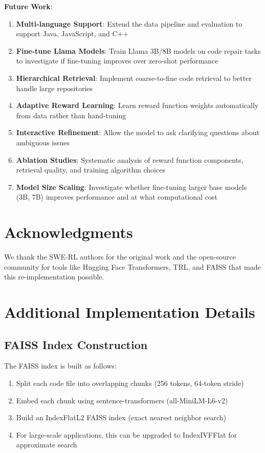 \documentclass{article} %
\begin{document}
\textbf{Future Work}:

\begin{enumerate}
    \item \textbf{Multi-language Support}: Extend the data pipeline and evaluation to support Java, JavaScript, and C++
    \item \textbf{Fine-tune Llama Models}: Train Llama 3B/8B models on code repair tasks to investigate if fine-tuning improves over zero-shot performance
    \item \textbf{Hierarchical Retrieval}: Implement coarse-to-fine code retrieval to better handle large repositories
    \item \textbf{Adaptive Reward Learning}: Learn reward function weights automatically from data rather than hand-tuning
    \item \textbf{Interactive Refinement}: Allow the model to ask clarifying questions about ambiguous issues
    \item \textbf{Ablation Studies}: Systematic analysis of reward function components, retrieval quality, and training algorithm choices
    \item \textbf{Model Size Scaling}: Investigate whether fine-tuning larger base models (3B, 7B) improves performance and at what computational cost
\end{enumerate}

\section*{Acknowledgments}

We thank the SWE-RL authors for the original work and the open-source community for tools like Hugging Face Transformers, TRL, and FAISS that made this re-implementation possible.




\appendix

\section{Additional Implementation Details}

\subsection{FAISS Index Construction}

The FAISS index is built as follows:

\begin{enumerate}
    \item Split each code file into overlapping chunks (256 tokens, 64-token stride)
    \item Embed each chunk using sentence-transformers (all-MiniLM-L6-v2)
    \item Build an IndexFlatL2 FAISS index (exact nearest neighbor search)
    \item For large-scale applications, this can be upgraded to IndexIVFFlat for approximate search
\end{enumerate}
\end{document}
